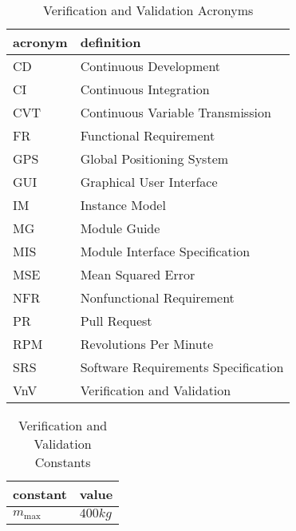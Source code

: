 \documentclass[12pt, titlepage]{article}
\begin{document}
\begin{table}[h] %
  \raggedright
  \begin{tabular}{l l} 
    \toprule		
    \textbf{acronym} & \textbf{definition}\\
    \midrule
    CD & Continuous Development\\
    CI & Continuous Integration\\ 
    CVT & Continuous Variable Transmission\\
    FR & Functional Requirement\\
    GPS & Global Positioning System\\
    GUI & Graphical User Interface\\
    IM & Instance Model\\
    MG & Module Guide\\
    MIS & Module Interface Specification\\
    MSE & Mean Squared Error\\
    NFR & Nonfunctional Requirement\\
    PR & Pull Request\\
    RPM & Revolutions Per Minute\\
    SRS & Software Requirements Specification\\
    VnV & Verification and Validation\\
    \bottomrule
  \end{tabular}
  \caption{Verification and Validation Acronyms}
  \label{tab:vnv_acronyms}
\end{table}

\begin{table}[h] %
  \raggedright
  \begin{tabular}{l l} 
    \toprule		
    \textbf{constant} & \textbf{value}\\
    \midrule
    $m_{\text{max}}$ & $400 kg$\\
    \bottomrule
  \end{tabular}
  \caption{Verification and Validation Constants}
  \label{tab:vnv_constants}
\end{table}



\newpage

\end{document}
